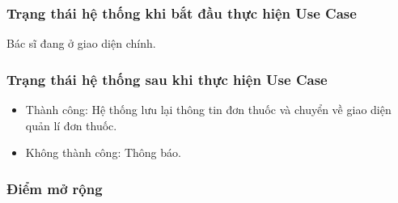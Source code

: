 \subsubsection{Trạng thái hệ thống khi bắt đầu thực hiện Use Case}
Bác sĩ đang ở giao diện chính.

\subsubsection{Trạng thái hệ thống sau khi thực hiện Use Case}
\begin{itemize}
  \item Thành công: Hệ thống lưu lại thông tin đơn thuốc và chuyển về giao diện quản lí đơn thuốc.
  \item Không thành công: Thông báo.
\end{itemize}

\subsubsection{Điểm mở rộng}
